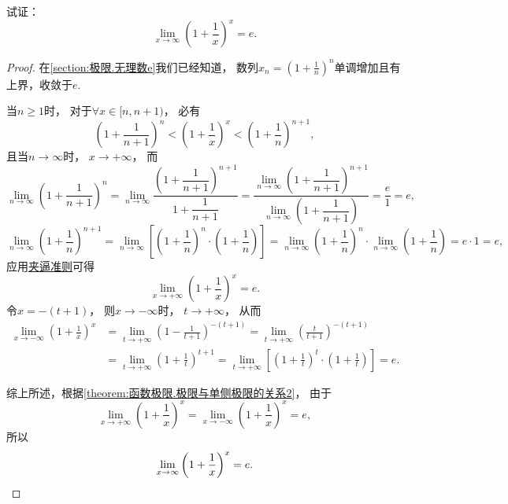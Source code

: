 \begin{example}[重要极限II]
试证：\begin{equation}\label{equation:函数极限.重要极限2}
	\lim_{x\to\infty} \left(1+\frac1x\right)^x = e.
\end{equation}
\begin{proof}
在\cref{section:极限.无理数e}我们已经知道，
数列\(x_n = \left(1+\frac1n\right)^n\)单调增加且有上界，收敛于\(e\).

当\(n\geq1\)时，
对于\(\forall x\in[n,n+1)\)，
必有\[
	\left(1+\frac1{n+1}\right)^n
	< \left(1+\frac1x\right)^x
	< \left(1+\frac1n\right)^{n+1},
\]
且当\(n\to\infty\)时，
\(x\to+\infty\)，
而\[
	\lim_{n\to\infty} \left(1+\frac1{n+1}\right)^n
	= \lim_{n\to\infty} \frac{\left(1+\dfrac1{n+1}\right)^{n+1}}{1+\dfrac1{n+1}}
	= \frac{\lim\limits_{n\to\infty} \left(1+\dfrac1{n+1}\right)^{n+1}}{\lim\limits_{n\to\infty} \left(1+\dfrac1{n+1}\right)}
	= \frac{e}1
	= e,
\]\[
	\lim_{n\to\infty} \left(1+\frac1n\right)^{n+1}
	= \lim_{n\to\infty} \left[\left(1+\frac1n\right)^n\cdot\left(1+\frac1n\right)\right]
	= \lim_{n\to\infty} \left(1+\frac1n\right)^n \cdot \lim_{n\to\infty} \left(1+\frac1n\right)
	= e \cdot 1
	= e,
\]
应用\hyperref[theorem:函数极限.夹逼准则]{夹逼准则}可得\[
	\lim_{x\to+\infty} \left(1+\frac1x\right)^x = e.
\]
令\(x=-(t+1)\)，
则\(x\to-\infty\)时，
\(t\to+\infty\)，
从而\begin{align*}
	\lim_{x\to-\infty} \left(1+\frac1x\right)^x
	&= \lim_{t\to+\infty} \left(1-\frac{1}{t+1}\right)^{-(t+1)}
	= \lim_{t\to+\infty} \left(\frac{t}{t+1}\right)^{-(t+1)} \\
	&= \lim_{t\to+\infty} \left(1+\frac1t\right)^{t+1}
	= \lim_{t\to+\infty} \left[\left(1+\frac1t\right)^t\cdot\left(1+\frac1t\right)\right]
	= e.
\end{align*}

综上所述，根据\cref{theorem:函数极限.极限与单侧极限的关系2}，
由于\[
	\lim_{x\to+\infty}\left(1+\frac1x\right)^x
	= \lim_{x\to-\infty}\left(1+\frac1x\right)^x
	= e,
\]
所以\[
	\lim_{x\to\infty} \left(1+\frac1x\right)^x = e.
	\qedhere
\]
\end{proof}
\end{example}
